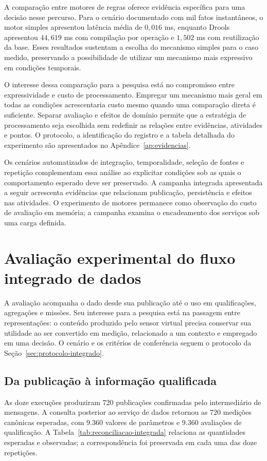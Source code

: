 \documentclass[tcc,capa]{texufpel}
\begin{document}
A comparação entre motores de regras oferece evidência específica para uma decisão nesse percurso. Para o cenário documentado com mil fatos instantâneos, o motor simples apresentou latência média de $0{,}016$ ms, enquanto Drools apresentou $44{,}619$ ms com compilação por operação e $1{,}502$ ms com reutilização da base. Esses resultados sustentam a escolha do mecanismo simples para o caso medido, preservando a possibilidade de utilizar um mecanismo mais expressivo em condições temporais.

O interesse dessa comparação para a pesquisa está no compromisso entre expressividade e custo de processamento. Empregar um mecanismo mais geral em todas as condições acrescentaria custo mesmo quando uma comparação direta é suficiente. Separar avaliação e efeitos de domínio permite que a estratégia de processamento seja escolhida sem redefinir as relações entre evidências, atividades e pontos. O protocolo, a identificação do registro e a tabela detalhada do experimento são apresentados no Apêndice~\ref{ap:evidencias}.

Os cenários automatizados de integração, temporalidade, seleção de fontes e repetição complementam essa análise ao explicitar condições sob as quais o comportamento esperado deve ser preservado. A campanha integrada apresentada a seguir acrescenta evidências que relacionam publicação, persistência e efeitos nas atividades. O experimento de motores permanece como observação do custo de avaliação em memória; a campanha examina o encadeamento dos serviços sob uma carga definida.

\section{Avaliação experimental do fluxo integrado de dados}\label{sec:avaliacao-integrada}
A avaliação acompanha o dado desde sua publicação até o uso em qualificações, agregações e missões. Seu interesse para a pesquisa está na passagem entre representações: o conteúdo produzido pelo sensor virtual precisa conservar sua utilidade ao ser convertido em medição, relacionado a um contexto e empregado em uma decisão. O cenário e os critérios de conferência seguem o protocolo da Seção~\ref{sec:protocolo-integrado}.

\subsection{Da publicação à informação qualificada}
As doze execuções produziram 720 publicações confirmadas pelo intermediário de mensagens. A consulta posterior ao serviço de dados retornou as 720 medições canônicas esperadas, com 9.360 valores de parâmetros e 9.360 avaliações de qualificação. A Tabela~\ref{tab:reconciliacao-integrada} relaciona as quantidades esperadas e observadas; a correspondência foi preservada em cada uma das doze repetições.
\end{document}

